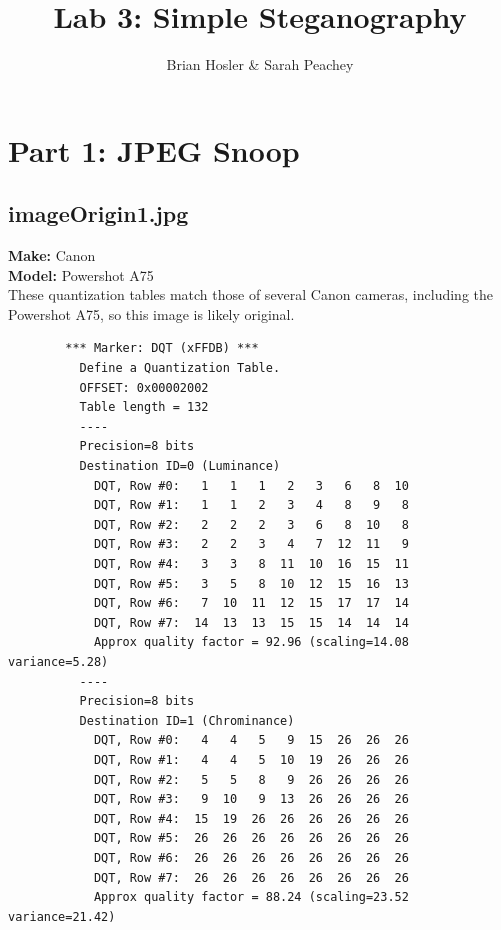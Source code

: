 \documentclass{article}
\begin{document}
\title{Lab 3: Simple Steganography}
\author{Brian Hosler \& Sarah Peachey }
\maketitle


\section{Part 1: JPEG Snoop}

\subsection{imageOrigin1.jpg}
	\textbf{Make:} Canon\\
	\textbf{Model:} Powershot A75\\
These quantization tables match those of several Canon cameras,
including the Powershot A75, so this image is likely original.
\begin{lstlisting}
		*** Marker: DQT (xFFDB) ***
		  Define a Quantization Table.
		  OFFSET: 0x00002002
		  Table length = 132
		  ----
		  Precision=8 bits
		  Destination ID=0 (Luminance)
			DQT, Row #0:   1   1   1   2   3   6   8  10 
			DQT, Row #1:   1   1   2   3   4   8   9   8 
			DQT, Row #2:   2   2   2   3   6   8  10   8 
			DQT, Row #3:   2   2   3   4   7  12  11   9 
			DQT, Row #4:   3   3   8  11  10  16  15  11 
			DQT, Row #5:   3   5   8  10  12  15  16  13 
			DQT, Row #6:   7  10  11  12  15  17  17  14 
			DQT, Row #7:  14  13  13  15  15  14  14  14 
			Approx quality factor = 92.96 (scaling=14.08 variance=5.28)
		  ----
		  Precision=8 bits
		  Destination ID=1 (Chrominance)
			DQT, Row #0:   4   4   5   9  15  26  26  26 
			DQT, Row #1:   4   4   5  10  19  26  26  26 
			DQT, Row #2:   5   5   8   9  26  26  26  26 
			DQT, Row #3:   9  10   9  13  26  26  26  26 
			DQT, Row #4:  15  19  26  26  26  26  26  26 
			DQT, Row #5:  26  26  26  26  26  26  26  26 
			DQT, Row #6:  26  26  26  26  26  26  26  26 
			DQT, Row #7:  26  26  26  26  26  26  26  26 
			Approx quality factor = 88.24 (scaling=23.52 variance=21.42)
\end{lstlisting}
\end{document}
